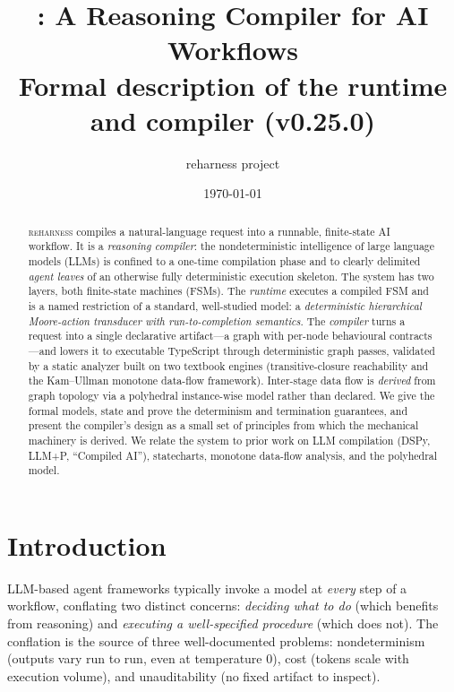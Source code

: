 \documentclass[11pt]{article}
\title{\reharness: A Reasoning Compiler for AI Workflows\\[4pt]
\large Formal description of the runtime and compiler (v0.25.0)}
\author{reharness project}
\date{\today}
\theoremstyle{plain}
\theoremstyle{definition}
\theoremstyle{remark}
\newcommand{\reharness}{\textsc{reharness}}
\begin{document}
\maketitle

\begin{abstract}
\reharness{} compiles a natural-language request into a runnable, finite-state
AI workflow. It is a \emph{reasoning compiler}: the nondeterministic intelligence
of large language models (LLMs) is confined to a one-time compilation phase and to
clearly delimited \emph{agent leaves} of an otherwise fully deterministic execution
skeleton. The system has two layers, both finite-state machines (FSMs). The
\emph{runtime} executes a compiled FSM and is a named restriction of a standard,
well-studied model: a \emph{deterministic hierarchical Moore-action transducer with
run-to-completion semantics}. The \emph{compiler} turns a request into a single
declarative artifact---a graph with per-node behavioural contracts---and lowers it
to executable TypeScript through deterministic graph passes, validated by a static
analyzer built on two textbook engines (transitive-closure reachability and the
Kam--Ullman monotone data-flow framework). Inter-stage data flow is \emph{derived}
from graph topology via a polyhedral instance-wise model rather than declared.
We give the formal models, state and prove the determinism and termination
guarantees, and present the compiler's design as a small set of principles from
which the mechanical machinery is derived. We relate the system to prior work on
LLM compilation (DSPy, LLM+P, ``Compiled AI''), statecharts, monotone data-flow
analysis, and the polyhedral model.
\end{abstract}

\tableofcontents

\section{Introduction}

LLM-based agent frameworks typically invoke a model at \emph{every} step of a
workflow, conflating two distinct concerns: \emph{deciding what to do} (which
benefits from reasoning) and \emph{executing a well-specified procedure} (which
does not). The conflation is the source of three well-documented problems:
nondeterminism (outputs vary run to run, even at temperature $0$), cost (tokens
scale with execution volume), and unauditability (no fixed artifact to inspect).
\end{document}
